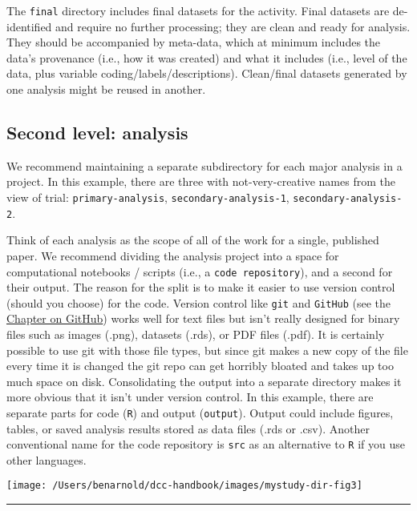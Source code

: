 \documentclass[]{book}
\begin{document}
The \texttt{final} directory includes final datasets for the activity. Final datasets are de-identified and require no further processing; they are clean and ready for analysis. They should be accompanied by meta-data, which at minimum includes the data's provenance (i.e., how it was created) and what it includes (i.e., level of the data, plus variable coding/labels/descriptions). Clean/final datasets generated by one analysis might be reused in another.

\hypertarget{second-level-analysis}{%
\subsection{Second level: analysis}\label{second-level-analysis}}

We recommend maintaining a separate subdirectory for each major analysis in a project. In this example, there are three with not-very-creative names from the view of trial: \texttt{primary-analysis}, \texttt{secondary-analysis-1}, \texttt{secondary-analysis-2}.

Think of each analysis as the scope of all of the work for a single, published paper. We recommend dividing the analysis project into a space for computational notebooks / scripts (i.e., a \texttt{code\ repository}), and a second for their output. The reason for the split is to make it easier to use version control (should you choose) for the code. Version control like \texttt{git} and \texttt{GitHub} (see the \protect\hyperlink{GitHub}{Chapter on GitHub}) works well for text files but isn't really designed for binary files such as images (.png), datasets (.rds), or PDF files (.pdf). It is certainly possible to use git with those file types, but since git makes a new copy of the file every time it is changed the git repo can get horribly bloated and takes up too much space on disk. Consolidating the output into a separate directory makes it more obvious that it isn't under version control. In this example, there are separate parts for code (\texttt{R}) and output (\texttt{output}). Output could include figures, tables, or saved analysis results stored as data files (.rds or .csv). Another conventional name for the code repository is \texttt{src} as an alternative to \texttt{R} if you use other languages.

\texttt{[image: /Users/benarnold/dcc-handbook/images/mystudy-dir-fig3]}

\begin{center}\rule{0.5\linewidth}{\linethickness}\end{center}
\end{document}
